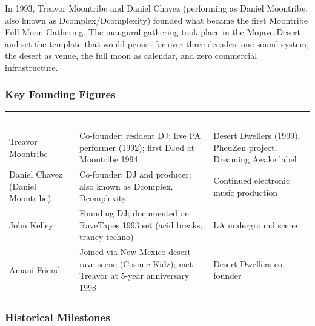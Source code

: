 \documentclass[11pt,letterpaper]{article}
\newcommand{\tableheader}[1]{\textbf{\sffamily\textcolor{white}{#1}}}
\begin{document}
In 1993, Treavor Moontribe and Daniel Chavez (performing as Daniel Moontribe, also known as Dcomplex/Dcomplexity) founded what became the first Moontribe Full Moon Gathering. The inaugural gathering took place in the Mojave Desert and set the template that would persist for over three decades: one sound system, the desert as venue, the full moon as calendar, and zero commercial infrastructure.

\subsubsection{Key Founding Figures}

\begin{center}
\begin{tabularx}{\textwidth}{L{3.5cm}XL{3cm}}
\toprule
{}
\tableheader{Person} & \tableheader{Role and Contribution} & \tableheader{Subsequent Work} \\
\midrule
Treavor Moontribe & Co-founder; resident DJ; live PA performer (1992); first DJed at Moontribe 1994 & Desert Dwellers (1999), PheuZen project, Dreaming Awake label \\
Daniel Chavez (Daniel Moontribe) & Co-founder; DJ and producer; also known as Dcomplex, Dcomplexity & Continued electronic music production \\
John Kelley & Founding DJ; documented on RaveTapes 1993 set (acid breaks, trancy techno) & LA underground scene \\
Amani Friend & Joined via New Mexico desert rave scene (Cosmic Kidz); met Treavor at 5-year anniversary 1998 & Desert Dwellers co-founder \\
\bottomrule
\end{tabularx}
\end{center}

\subsubsection{Historical Milestones}
\end{document}
